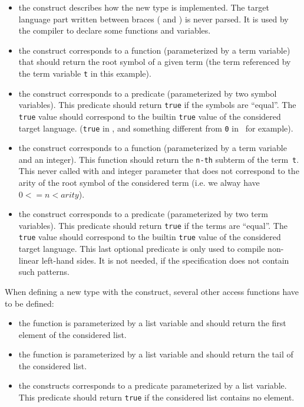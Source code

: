 \begin{itemize}
\item\label{implement} the  construct describes how the new type is 
  implemented. The target language part written between braces
  ( and ) is never parsed. It is used by
  the compiler to declare some functions and variables.

\item\label{getfs} the  construct corresponds to a
  function (parameterized by a term variable) that should return the
  root symbol of a given term (the term referenced by the term
  variable \texttt{t} in this example). 

\item\label{cmpfs} the  construct corresponds to a
  predicate (parameterized by two symbol variables).
  This predicate should return \texttt{true} if the symbols are
  ``equal''. The \texttt{true} value should correspond to the 
  builtin \texttt{true} value of the considered target language.
  (\texttt{true} in \Java, and something different from \texttt{0} in
  \Clang\ for example). 

\item\label{getsub} the  construct corresponds to a
  function (parameterized by a term variable and an integer).
  This function should return the \texttt{n-th} subterm of the
  term~\texttt{t}. This never called with and integer parameter that
  does not correspond to the arity of the root symbol of the
  considered term (i.e. we alway have $0 <= n < arity$).

\item\label{equals} the  construct corresponds to a
  predicate (parameterized by two term variables).
  This predicate should return \texttt{true} if the terms are
  ``equal''. The \texttt{true} value should correspond to the 
  builtin \texttt{true} value of the considered target language.
  This last optional predicate is only used to compile non-linear 
  left-hand sides. It is not needed, if the specification does not
  contain such patterns.
\end{itemize}


\noindent\label{listdef}
When defining a new type with the  construct,
several other access functions have to be defined:
\begin{itemize}
\item\label{geth} the  function is parameterized by a list
  variable and should return the first element of the considered list.

\item\label{gett} the  function is parameterized by a list
  variable and should return the tail of the considered list.

\item\label{isempty} the  constructs corresponds to a
  predicate parameterized by a list variable.
  This predicate should return \texttt{true} if the considered list
  contains no element.
\end{itemize}

